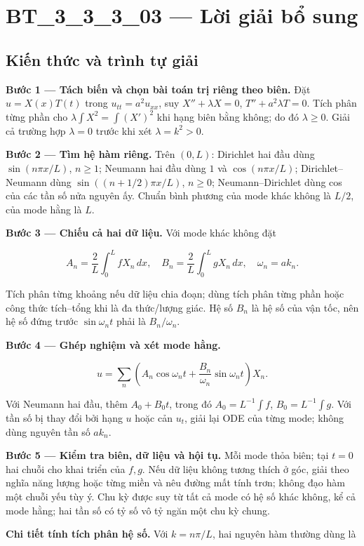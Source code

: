 \documentclass[10pt,a4paper]{article}
\begin{document}
\section*{BT\_3\_3\_3\_03 — Lời giải bổ sung}
\subsection*{Kiến thức và trình tự giải}
\textbf{Bước 1 — Tách biến và chọn bài toán trị riêng theo biên.} Đặt $u=X(x)T(t)$ trong $u_{tt}=a^2u_{xx}$, suy $X''+\lambda X=0$, $T''+a^2\lambda T=0$. Tích phân từng phần cho $\lambda\int X^2=\int (X')^2$ khi hạng biên bằng không; do đó $\lambda\ge0$. Giải cả trường hợp $\lambda=0$ trước khi xét $\lambda=k^2>0$.

\textbf{Bước 2 — Tìm hệ hàm riêng.} Trên $(0,L)$: Dirichlet hai đầu dùng $\sin(n\pi x/L)$, $n\ge1$; Neumann hai đầu dùng $1$ và $\cos(n\pi x/L)$; Dirichlet–Neumann dùng $\sin((n+1/2)\pi x/L)$, $n\ge0$; Neumann–Dirichlet dùng cos của các tần số nửa nguyên ấy. Chuẩn bình phương của mode khác không là $L/2$, của mode hằng là $L$.

\textbf{Bước 3 — Chiếu cả hai dữ liệu.} Với mode khác không đặt


\[
A_n=\frac2L\int_0^L fX_n\,dx,\quad B_n=\frac2L\int_0^L gX_n\,dx,\quad \omega_n=ak_n.
\]


Tích phân từng khoảng nếu dữ liệu chia đoạn; dùng tích phân từng phần hoặc công thức tích–tổng khi là đa thức/lượng giác. Hệ số $B_n$ là hệ số của vận tốc, nên hệ số đứng trước $\sin\omega_nt$ phải là $B_n/\omega_n$.

\textbf{Bước 4 — Ghép nghiệm và xét mode hằng.}


\[
u=\sum_n\left(A_n\cos\omega_nt+\frac{B_n}{\omega_n}\sin\omega_nt\right)X_n.
\]


Với Neumann hai đầu, thêm $A_0+B_0t$, trong đó $A_0=L^{-1}\int f$, $B_0=L^{-1}\int g$. Với tần số bị thay đổi bởi hạng $u$ hoặc cản $u_t$, giải lại ODE của từng mode; không dùng nguyên tần số $ak_n$.

\textbf{Bước 5 — Kiểm tra biên, dữ liệu và hội tụ.} Mỗi mode thỏa biên; tại $t=0$ hai chuỗi cho khai triển của $f,g$. Nếu dữ liệu không tương thích ở góc, giải theo nghĩa năng lượng hoặc từng miền và nêu đường mất tính trơn; không đạo hàm một chuỗi yếu tùy ý. Chu kỳ được suy từ tất cả mode có hệ số khác không, kể cả mode hằng; hai tần số có tỷ số vô tỷ ngăn một chu kỳ chung.

\textbf{Chi tiết tính tích phân hệ số.} Với $k=n\pi/L$, hai nguyên hàm thường dùng là
\end{document}
